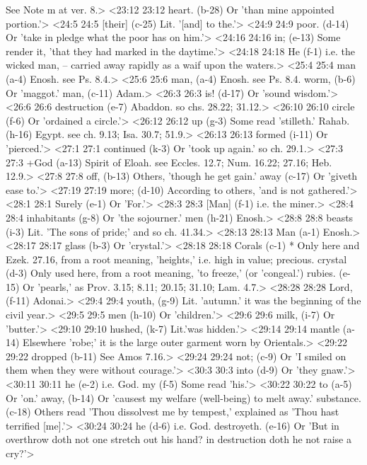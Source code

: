   See Note m at ver. 8.>
<23:12 23:12  heart. (b-28)  Or 'than mine appointed portion.'>
<24:5 24:5  [their] (c-25)  Lit. '[and] to the.'>
<24:9 24:9  poor. (d-14)  Or 'take in pledge what the poor has on him.'>
<24:16 24:16  in; (e-13)  Some render it, 'that they had marked in the daytime.'>
<24:18 24:18  He (f-1)  i.e. the wicked man, -- carried away rapidly as a waif upon  the waters.>
<25:4 25:4  man (a-4)  Enosh. see Ps. 8.4.>
<25:6 25:6  man, (a-4)  Enosh. see Ps. 8.4.
  worm, (b-6)  Or 'maggot.'
  man, (c-11)  Adam.>
<26:3 26:3  is! (d-17)  Or 'sound wisdom.'>
<26:6 26:6  destruction (e-7)  Abaddon. so chs. 28.22; 31.12.>
<26:10 26:10  circle (f-6)  Or 'ordained a circle.'>
<26:12 26:12  up (g-3)  Some read 'stilleth.'
  Rahab. (h-16)  Egypt. see ch. 9.13; Isa. 30.7; 51.9.>
<26:13 26:13  formed (i-11)  Or 'pierced.'>
<27:1 27:1  continued (k-3)  Or 'took up again.' so ch. 29.1.>
<27:3 27:3  +God (a-13)  Spirit of Eloah. see Eccles. 12.7; Num. 16.22; 27.16; Heb. 12.9.>
<27:8 27:8  off, (b-13)  Others, 'though he get gain.'
  away (c-17)  Or 'giveth ease to.'>
<27:19 27:19  more; (d-10)  According to others, 'and is not gathered.'>
<28:1 28:1  Surely (e-1)  Or 'For.'>
<28:3 28:3  [Man] (f-1)  i.e. the miner.>
<28:4 28:4  inhabitants (g-8)  Or 'the sojourner.'
  men (h-21)  Enosh.>
<28:8 28:8  beasts (i-3)  Lit. 'The sons of pride;' and so ch. 41.34.>
<28:13 28:13  Man (a-1)  Enosh.>
<28:17 28:17  glass (b-3)  Or 'crystal.'>
<28:18 28:18  Corals (c-1)  * Only here and Ezek. 27.16, from a root meaning, 'heights,'  i.e. high in value; precious.
  crystal (d-3)  Only used here, from a root meaning, 'to freeze,' (or  'congeal.')
  rubies. (e-15)  Or 'pearls,' as Prov. 3.15; 8.11; 20.15; 31.10; Lam. 4.7.>
<28:28 28:28  Lord, (f-11)  Adonai.>
<29:4 29:4  youth, (g-9)  Lit. 'autumn.' it was the beginning of the civil year.>
<29:5 29:5  men (h-10)  Or 'children.'>
<29:6 29:6  milk, (i-7)  Or 'butter.'>
<29:10 29:10  hushed, (k-7)  Lit.'was hidden.'>
<29:14 29:14  mantle (a-14)  Elsewhere 'robe;' it is the large outer garment worn by  Orientals.>
<29:22 29:22  dropped (b-11)  See Amos 7.16.>
<29:24 29:24  not; (c-9)  Or 'I smiled on them when they were without courage.'>
<30:3 30:3  into (d-9)  Or 'they gnaw.'>
<30:11 30:11  he (e-2)  i.e. God.
  my (f-5)  Some read 'his.'>
<30:22 30:22  to (a-5)  Or 'on.'
  away, (b-14)  Or 'causest my welfare (well-being) to melt away.'
  substance. (c-18)  Others read 'Thou dissolvest me by tempest,' explained as  'Thou hast terrified [me].'>
<30:24 30:24  he (d-6)  i.e. God.
  destroyeth. (e-16)  Or 'But in overthrow doth not one stretch out his hand? in  destruction doth he not raise a cry?'>
